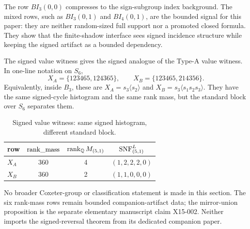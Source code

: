 The row \(BI_3(0,0)\) compresses to the sign-subgroup index background.  The mixed rows, such as \(BI_3(0,1)\) and \(BI_4(0,1)\), are the bounded signal for this paper: they are neither random-sized full support nor a promoted closed formula.  They show that the finite-shadow interface sees signed incidence structure while keeping the signed artifact as a bounded dependency.

The signed value witness gives the signed analogue of the Type-A value witness.  In one-line notation on \(S_6\),
\[
  X_A=\{123465,124365\},\qquad
  X_B=\{123465,214356\}.
\]
Equivalently, inside \(B_3\), these are \(X_A=s_3\langle s_2\rangle\) and \(X_B=s_3\langle s_1s_2s_3\rangle\).  They have the same signed-cycle histogram and the same rank mass, but the standard block over \(S_6\) separates them.

\begin{table}[ht]
\centering
\caption{Signed value witness: same signed histogram, different standard block.}
\label{tab:signed-value-witness}
\begin{tabular}{@{}lccc@{}}
\toprule
row & \(\operatorname{rank\_mass}\) & \(\operatorname{rank}_\mathbb{Q}M_{(5,1)}\) & \(\operatorname{SNF}^{L}_{(5,1)}\) \\
\midrule
\(X_A\) & 360 & 4 & \((1,2,2,2,0)\) \\
\(X_B\) & 360 & 2 & \((1,1,0,0,0)\) \\
\bottomrule
\end{tabular}
\end{table}

No broader Coxeter-group or classification statement is made in this section.  The six rank-mass rows remain bounded companion-artifact data; the mirror-union proposition is the separate elementary manuscript claim X15-002.  Neither imports the signed-reversal theorem from its dedicated companion paper\cite{BabanskyySignedReversal2026}.
